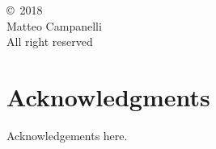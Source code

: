 

\cleardoublepage

\null\vfill
\noindent
\begin{center}
\copyright \ 2018 \\ Matteo Campanelli\\
All right reserved
\end{center}
\newpage

\begin{abstractpage}

\end{abstractpage}

% 
%
\myreaderpage
\cleardoublepage
\section*{Acknowledgments}

Acknowledgements here.

\restoregeometry



